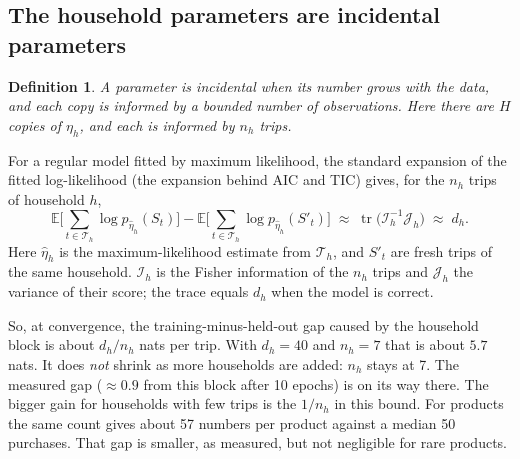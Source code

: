 \documentclass[11pt]{article}
\newtheorem{definition}{Definition}
\theoremstyle{remark}\newtheorem{remark}{Remark}
\newcommand{\E}{\mathbb{E}}
\begin{document}
\subsection{The household parameters are incidental parameters}
\begin{definition}
A parameter is \emph{incidental} when its number grows with the data, and each copy is informed by
a bounded number of observations. Here there are $H$ copies of $\eta_h$, and each is informed by $n_h$ trips.
\end{definition}
\noindent For a regular model fitted by maximum likelihood, the standard expansion of the fitted
log-likelihood (the expansion behind AIC and TIC) gives, for the $n_h$ trips of household $h$,
\begin{equation}\label{eq:optimism}
\E\Big[\sum_{t\in\mathcal T_h}\log p_{\hat\eta_h}(S_t)\Big]-\E\Big[\sum_{t\in\mathcal T_h}\log p_{\hat\eta_h}(S'_t)\Big]
\;\approx\;\operatorname{tr}\!\big(\mathcal I_h^{-1}\mathcal J_h\big)\;\approx\;d_h .
\end{equation}
Here $\hat\eta_h$ is the maximum-likelihood estimate from $\mathcal T_h$, and $S'_t$ are fresh trips
of the same household. $\mathcal I_h$ is the Fisher information of the $n_h$ trips and
$\mathcal J_h$ the variance of their score; the trace equals $d_h$ when the model is correct.

So, at convergence, the training-minus-held-out gap caused by the household block is about
$d_h/n_h$ nats per trip. With $d_h=40$ and $n_h=7$ that is about $5.7$ nats. It does \emph{not}
shrink as more households are added: $n_h$ stays at 7. The measured gap ($\approx0.9$ from this
block after 10 epochs) is on its way there. The bigger gain for households with few trips is the
$1/n_h$ in this bound. For products the same count gives about 57 numbers per product against a
median 50 purchases. That gap is smaller, as measured, but not negligible for rare products.
\end{document}
